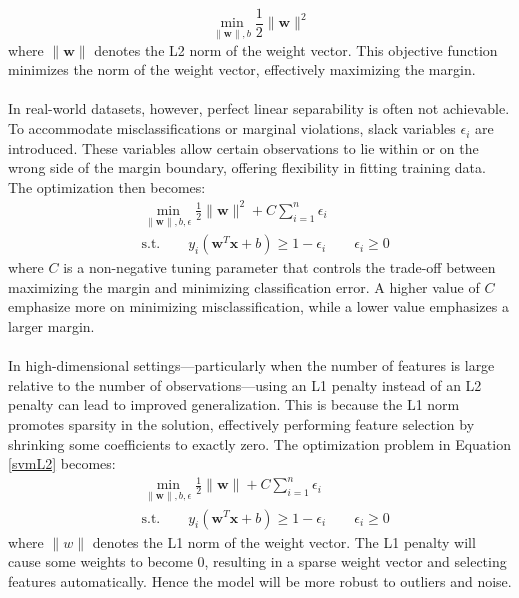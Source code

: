 \begin{equation}
	\min_{\|\mathbf{w}\|,b}\frac{1}{2}\|\mathbf{w}\|^2
\end{equation}
where $\|\mathbf{w}\|$ denotes the L2 norm of the weight vector. This objective function minimizes the norm of the weight vector, effectively maximizing the margin.\\
\\
In real-world datasets, however, perfect linear separability is often not achievable. To accommodate misclassifications or marginal violations, slack variables $\epsilon_i$ are introduced. These variables allow certain observations to lie within or on the wrong side of the margin boundary, offering flexibility in fitting training data. The optimization then becomes:\\
\begin{equation}
\begin{split}
& \min_{\|\mathbf{w}\|,b,\epsilon}\frac{1}{2}\|\mathbf{w}\|^2+C\sum_{i=1}^n \epsilon_i \\
& \text{s.t.} \qquad y_i(\mathbf{w}^T\mathbf{x}+b) \geq 1-\epsilon_i \qquad \epsilon_i \geq 0
\end{split}
\label{svmL2}
\end{equation}
where $C$ is a non-negative tuning parameter that controls the trade-off between maximizing the margin and minimizing classification error. A higher value of $C$ emphasize more on minimizing misclassification, while a lower value emphasizes a larger margin. \\
\\
In high-dimensional settings—particularly when the number of features is large relative to the number of observations—using an L1 penalty instead of an L2 penalty can lead to improved generalization. This is because the L1 norm promotes sparsity in the solution, effectively performing feature selection by shrinking some coefficients to exactly zero. The optimization problem in Equation \eqref{svmL2} becomes:\\
\begin{equation}
\begin{split}
& \min_{\|\mathbf{w}\|,b,\epsilon}\frac{1}{2}\|\mathbf{w}\|+C\sum_{i=1}^n \epsilon_i \\
& \text{s.t.} \qquad y_i(\mathbf{w}^T\mathbf{x}+b) \geq 1-\epsilon_i \qquad \epsilon_i \geq 0
\end{split}
\label{svmL1}
\end{equation}
where $\|w\|$ denotes the L1 norm of the weight vector. The L1 penalty will cause some weights to become 0, resulting in a sparse weight vector and selecting features automatically. Hence the model will be more robust to outliers and noise.
